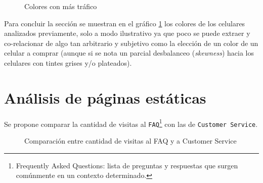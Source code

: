 \documentclass[a4paper]{article}
\begin{document}
\begin{figure}[h!]
	\caption{Colores con más tráfico}
	\label{fig:colores}
\end{figure}

Para concluir la sección se muestran en el gráfico \ref{fig:colores} los colores de los celulares analizados previamente, solo a modo ilustrativo ya que poco se puede extraer y co-relacionar de algo tan arbitrario y subjetivo como la elección de un color de un celular a comprar (aunque si se nota un parcial desbalanceo (\textit{skewness}) hacia los celulares con tintes grises y/o plateados).

\section{Análisis de páginas estáticas}

Se propone comparar la cantidad de visitas al \texttt{FAQ}\footnote{Frequently Asked Questions: lista de preguntas y respuestas que surgen comúnmente en un contexto determinado.} con las de \texttt{Customer Service}.

\begin{figure}[h!]
	\caption{Comparación entre cantidad de visitas al FAQ y a Customer Service}
	\label{fig:staticpage}
\end{figure}
\end{document}
